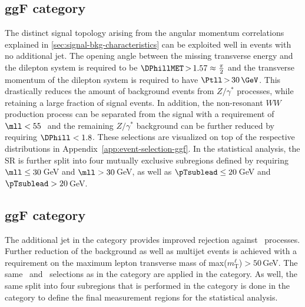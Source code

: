 
\subsection{ggF \ZeroJet category}
\label{subsec:ggf-zero-jet-category}
The distinct signal topology arising from the angular momentum correlations explained in \cref{sec:signal-bkg-characteristics} can be exploited well in events with no additional jet.
The opening angle between the missing transverse energy and the dilepton system is required to be $\DPhillMET \,{>}\, 1.57 \approx \frac{\pi}{2}$ and the transverse momentum of the dilepton system is required to have $\Ptll \,{>}\, 30\,\GeV$.
This drastically reduces the amount of background events from $Z/\gamma^*$ processes, while retaining a large fraction of signal events.
In addition, the non-resonant $WW$ production process can be separated from the signal with a requirement of $\mll < 55$\,\GeV\ and the remaining $Z/\gamma^*$ background can be further reduced by requiring $\DPhill < 1.8$. These selections are visualized on top of the respective distributions in Appendix~\ref{app:event-selection-ggf}.
In the statistical analysis, the \ZeroJet SR is further split into four mutually exclusive subregions defined by requiring $\mll \le 30$\,GeV and $\mll > 30$\,GeV, as well as $\pTsublead \le 20$\,GeV and $\pTsublead > 20$\,GeV.

\subsection{ggF \OneJet category}
\label{subsec:ggf-one-jet-category}
The additional jet in the \OneJet category provides improved rejection against \Ztautau\ processes.
Further reduction of the \Zgamma background as well as multijet events is achieved with a requirement on the maximum lepton transverse mass of max($m_{\text{T}}^\ell$)$ > 50\,$GeV.
The same \mll\ and \DPhill\ selections as in the \ZeroJet category are applied in the \OneJet category.
As well, the same split into four subregions that is performed in the \ZeroJet category is done in the \OneJet category to define the final measurement regions for the statistical analysis. 

